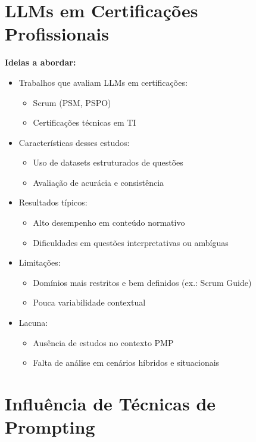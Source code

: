 \section{LLMs em Certificações Profissionais}
\label{subsec:llm_certificacao}

\textbf{Ideias a abordar:}
\begin{itemize}
    \item Trabalhos que avaliam LLMs em certificações:
    \begin{itemize}
        \item Scrum (PSM, PSPO)
        \item Certificações técnicas em TI
    \end{itemize}
    \item Características desses estudos:
    \begin{itemize}
        \item Uso de datasets estruturados de questões
        \item Avaliação de acurácia e consistência
    \end{itemize}
    \item Resultados típicos:
    \begin{itemize}
        \item Alto desempenho em conteúdo normativo
        \item Dificuldades em questões interpretativas ou ambíguas
    \end{itemize}
    \item Limitações:
    \begin{itemize}
        \item Domínios mais restritos e bem definidos (ex.: Scrum Guide)
        \item Pouca variabilidade contextual
    \end{itemize}
    \item Lacuna:
    \begin{itemize}
        \item Ausência de estudos no contexto PMP
        \item Falta de análise em cenários híbridos e situacionais
    \end{itemize}
\end{itemize}




\section{Influência de Técnicas de Prompting}
\label{subsec:prompt_related}

